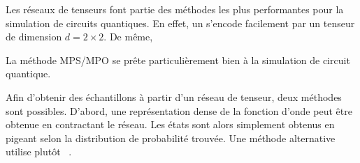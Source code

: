 Les réseaux de tenseurs font partie des méthodes les plus performantes pour la simulation de circuits quantiques. En effet, un s'encode facilement par un tenseur de dimension $d = 2 \times 2$. De même, 

La méthode MPS/MPO se prête particulièrement bien à la simulation de circuit quantique. 

Afin d'obtenir des échantillons à partir d'un réseau de tenseur, deux méthodes sont possibles. D'abord, une représentation dense de la fonction d'onde peut être obtenue en contractant le réseau. Les états sont alors simplement obtenus en pigeant selon la distribution de probabilité trouvée. Une méthode alternative utilise plutôt ~\cite{ferrisPerfectSamplingUnitary2012}. 






